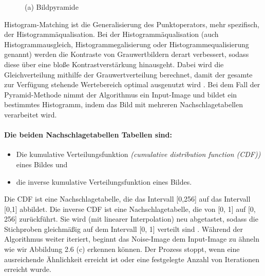 \documentclass[12pt, a4paper,twoside,openany]{report} %
\begin{document}
\begin{figure}[H]
    \centering
    \caption{(a) Bildpyramide}%
\end{figure}

Histogram-Matching ist die Generalisierung des Punktoperators, mehr spezifisch, der Histogrammäqualisation.
Bei der Histogrammäqualisation {(auch Histogrammausgleich, Histogrammegalisierung oder Histogrammequalisierung genannt)}
werden die Kontraste von Grauwertbildern derart verbessert, sodass diese über eine bloße Kontrastverstärkung hinausgeht.
Dabei wird die Gleichverteilung mithilfe der Grauwertverteilung berechnet, damit der gesamte zur Verfügung stehende Wertebereich optimal ausgenutzt wird \cite{Lehmann2013}.
Bei dem Fall der Pyramid-Methode nimmt der Algorithmus ein Input-Image und bildet ein bestimmtes Histogramm, indem das Bild mit mehreren Nachschlagetabellen verarbeitet wird.
\paragraph{Die beiden Nachschlagetabellen Tabellen sind:}
\begin{itemize}
    \itemsep-0.5em
    \item Die kumulative Verteilungsfunktion \textit{(cumulative distribution function (CDF))} eines Bildes und
    \item die inverse kumulative Verteilungsfunktion eines Bildes.
\end{itemize} 

Die CDF ist eine Nachschlagetabelle, die das Intervall {[0,256]} auf das Intervall {[0,1]} abbildet.
Die inverse CDF ist eine Nachschlagetabelle, die von {[0, 1]} auf {[0, 256]} zurückführt.
Sie wird {(mit linearer Interpolation)} neu abgetastet,
sodass die Stichproben gleichmäßig auf dem Intervall {[0, 1]} verteilt sind \cite{Heeger}.
\newline
Während der Algorithmus weiter iteriert, beginnt das Noise-Image dem Input-Image zu ähneln wie wir Abbildung 2.6 {(c)} erkennen können.
Der Prozess stoppt, wenn eine ausreichende Ähnlichkeit erreicht ist oder eine festgelegte Anzahl von Iterationen erreicht wurde.
\end{document}
